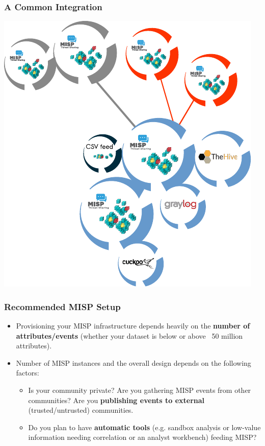 
\begin{frame}[t,plain]
\titlepage
\end{frame}

\begin{frame}
\frametitle{A Common Integration}
        \includegraphics[scale=0.8]{misp-integration-overview.pdf}
\end{frame}

\begin{frame}
\frametitle{Recommended MISP Setup}
    \begin{itemize}
            \item Provisioning your MISP infrastructure depends heavily on the {\bf number of attributes/events} (whether your dataset is below or above ~50 million attributes).
            \item Number of MISP instances and the overall design depends on the following factors:
                    \begin{itemize}
                            \item Is your community private? Are you gathering MISP events from other communities? Are you {\bf publishing events to external} (trusted/untrusted) communities.
                            \item Do you plan to have {\bf automatic tools} (e.g. sandbox analysis or low-value information needing correlation or an analyst workbench) feeding MISP?
                    \end{itemize}
    \end{itemize}
\end{frame}

